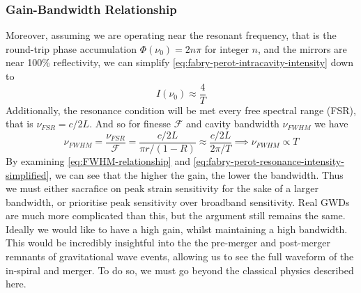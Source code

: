 \documentclass[aps,  
                a4paper, 
                amsmath, 
                amssymb, 
                preprint,
                tightenlines,  
                amsfonts,
                nofootinbib,
                onecolumn,
                titlepage,
                10pt
            ]{revtex4-2}
\begin{document}
    \subsubsection*{Gain-Bandwidth Relationship}
    Moreover, assuming we are operating near the resonant frequency, that is the round-trip phase accumulation $\Phi(\nu_0)= 2n\pi$ for integer $n$, and the mirrors are near 100\% reflectivity, we can simplify \eqref{eq:fabry-perot-intracavity-intensity} down to
    \begin{equation}
        \label{eq:fabry-perot-resonance-intensity-simplified}
        I(\nu_0)\approx\frac{4}{T}
    \end{equation}
    Additionally, the resonance condition will be met every free spectral range (FSR), that is $\nu_{FSR}=c/2L$. And so for finesse $\mathcal{F}$ and cavity bandwidth $\nu_{FWHM}$ we have
    \begin{equation}
        \label{eq:FWHM-relationship}
        \nu_{FWHM}=\frac{\nu_{FSR}}{\mathcal{F}}=\frac{c/2L}{\pi r/(1-R)}\approx\frac{c/2L}{2\pi/T}\implies\nu_{FWHM}\propto T
    \end{equation}
    By examining \eqref{eq:FWHM-relationship} and \eqref{eq:fabry-perot-resonance-intensity-simplified}, we can see that the higher the gain, the lower the bandwidth. Thus we must either sacrafice on peak strain sensitivity for the sake of a larger bandwidth, or prioritise peak sensitivity over broadband sensitivity. Real GWDs are much more complicated than this, but the argument still remains the same. Ideally we would like to have a high gain, whilst maintaining a high bandwidth. This would be incredibly insightful into the the pre-merger and post-merger remnants of gravitational wave events, allowing us to see the full waveform of the in-spiral and merger. To do so, we must go beyond the classical physics described here.
\end{document}
